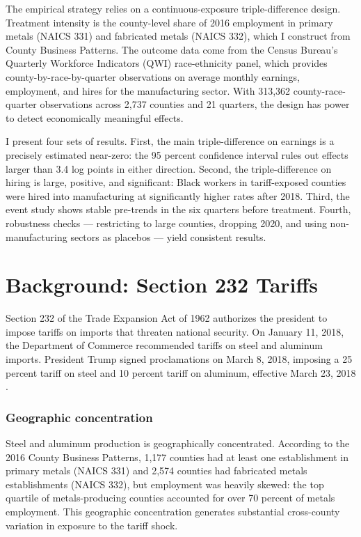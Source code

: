 \documentclass[12pt]{article}
\begin{document}
The empirical strategy relies on a continuous-exposure triple-difference design. Treatment intensity is the county-level share of 2016 employment in primary metals (NAICS 331) and fabricated metals (NAICS 332), which I construct from County Business Patterns. The outcome data come from the Census Bureau's Quarterly Workforce Indicators (QWI) race-ethnicity panel, which provides county-by-race-by-quarter observations on average monthly earnings, employment, and hires for the manufacturing sector. With 313,362 county-race-quarter observations across 2,737 counties and 21 quarters, the design has power to detect economically meaningful effects.

I present four sets of results. First, the main triple-difference on earnings is a precisely estimated near-zero: the 95 percent confidence interval rules out effects larger than 3.4 log points in either direction. Second, the triple-difference on hiring is large, positive, and significant: Black workers in tariff-exposed counties were hired into manufacturing at significantly higher rates after 2018. Third, the event study shows stable pre-trends in the six quarters before treatment. Fourth, robustness checks --- restricting to large counties, dropping 2020, and using non-manufacturing sectors as placebos --- yield consistent results.


\section{Background: Section 232 Tariffs}

Section 232 of the Trade Expansion Act of 1962 authorizes the president to impose tariffs on imports that threaten national security. On January 11, 2018, the Department of Commerce recommended tariffs on steel and aluminum imports. President Trump signed proclamations on March 8, 2018, imposing a 25 percent tariff on steel and 10 percent tariff on aluminum, effective March 23, 2018 \citep{congressional2020section}.

\subsubsection*{Geographic concentration} Steel and aluminum production is geographically concentrated. According to the 2016 County Business Patterns, 1,177 counties had at least one establishment in primary metals (NAICS 331) and 2,574 counties had fabricated metals establishments (NAICS 332), but employment was heavily skewed: the top quartile of metals-producing counties accounted for over 70 percent of metals employment. This geographic concentration generates substantial cross-county variation in exposure to the tariff shock.
\end{document}

